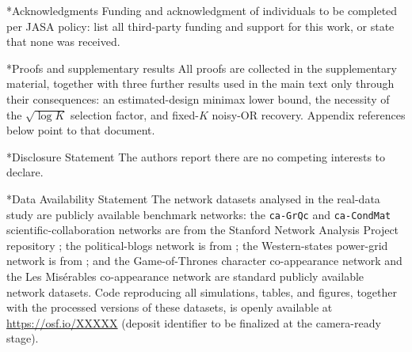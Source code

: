 \documentclass[12pt]{article}
\makeatletter
\newif\ifblind\blindfalse %
\def\section{\@startsection{section}{1}{\z@}{-0.16in}{0.04in}{\large\bf\raggedright}}
\newcommand{\1}{\mathbf{1}}
\makeatother
\begin{document}
\ifblind\else
\section*{Acknowledgments}
Funding and acknowledgment of individuals to be completed per JASA policy: list all third-party funding and support for this work, or state that none was received.
\fi

\section*{Proofs and supplementary results}
All proofs are collected in the supplementary material, together with three further results used in the main text only through their consequences: an estimated-design minimax lower bound, the necessity of the $\sqrt{\log K}$ selection factor, and fixed-$K$ noisy-OR recovery. Appendix references below point to that document.


\section*{Disclosure Statement}
The authors report there are no competing interests to declare.

\section*{Data Availability Statement}
The network datasets analysed in the real-data study are publicly available benchmark networks: the \texttt{ca-GrQc} and \texttt{ca-CondMat} scientific-collaboration networks are from the Stanford Network Analysis Project repository \citep{leskovec2007graph}; the political-blogs network is from \citet{adamic2005political}; the Western-states power-grid network is from \citet{watts1998collective}; and the Game-of-Thrones character co-appearance network and the Les Mis\'erables co-appearance network are standard publicly available network datasets. \ifblind Code reproducing all simulations, tables, and figures, together with the processed versions of these datasets, has been deposited in a public repository; the repository identifier is omitted from this anonymized version to preserve double-anonymous peer review and is supplied to the editors through the submission system.\else Code reproducing all simulations, tables, and figures, together with the processed versions of these datasets, is openly available at \url{https://osf.io/XXXXX} (deposit identifier to be finalized at the camera-ready stage).\fi
\end{document}
